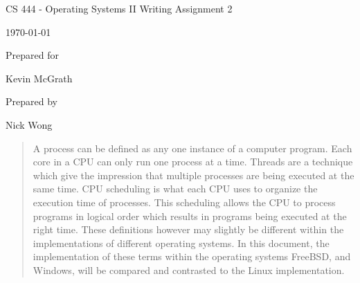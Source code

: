 \documentclass[onecolumn, draftclsnofoot,10pt, compsoc]{IEEEtran}
\def \GroupMemberOne{           Nick Wong}
\def \CapstoneSponsorPerson{        Kevin McGrath}
\def \DocType{    %
        Writing Assignment 2
        }
\newcommand{\NameSigPair}[1]{\par
\makebox[2.75in][r]{#1} \hfil   \makebox[3.25in]{\makebox[2.25in]{\hrulefill} \hfill    \makebox[.75in]{\hrulefill}}
\par\vspace{-12pt} \textit{\tiny\noindent
\makebox[2.75in]{} \hfil    \makebox[3.25in]{\makebox[2.25in][r]{Signature} \hfill  \makebox[.75in][r]{Date}}}}
\begin{document}
\begin{titlepage}
    \begin{singlespace}
        \hfill 
        \par\vspace{.2in}
        \centering
        \scshape{
            \huge CS 444 - Operating Systems II \DocType \par
            {\large\today}\par
            \vspace{.5in}
            \vfill
            {\large Prepared for}\par
            \vspace{5pt}
            {\CapstoneSponsorPerson\par}
            {\large Prepared by }\par
            \GroupMemberOne\par
            \vspace{5pt}
            \vspace{20pt}
        }
        \begin{abstract}
           A process can be defined as any one instance of a computer program. Each core in a CPU can only run one process at a time. Threads are a technique which give the impression that multiple processes are being executed at the same time. CPU scheduling is what each CPU uses to organize the execution time of processes. This scheduling allows the CPU to process programs in logical order which results in programs being executed at the right time. These definitions however may slightly be different within the implementations of different operating systems. In this document, the implementation of these terms within the operating systems FreeBSD, and Windows, will be compared and contrasted to the Linux implementation. 

        \end{abstract}     
    \end{singlespace}
\end{titlepage}
\newpage
{}
\tableofcontents
\clearpage
\end{document}

